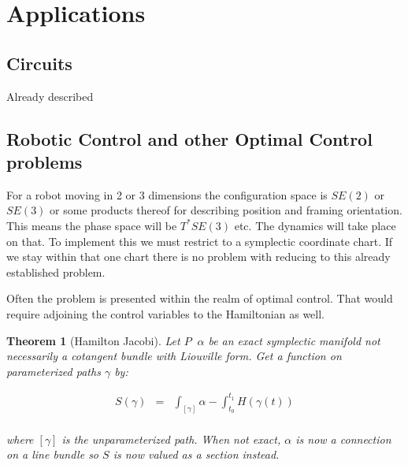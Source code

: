 \documentclass[a4paper,landscape]{article}
\theoremstyle{change}
\newtheorem{thm}[equation]{Theorem}
\theoremstyle{nonumberplain}
\numberwithin{equation}{section}
\begin{document}
\section{Applications}

\subsection{Circuits}

Already described

\subsection{Robotic Control and other Optimal Control problems}

For a robot moving in 2 or 3 dimensions the configuration space is $SE(2)$ or $SE(3)$ or some products thereof for describing position and framing orientation. This means the phase space will be $T^* SE(3)$ etc. The dynamics will take place on that. To implement this we must restrict to a symplectic coordinate chart. If we stay within that one chart there is no problem with reducing to this already established problem.

Often the problem is presented within the realm of optimal control. That would require adjoining the control variables to the Hamiltonian as well.

\begin{thm}[Hamilton Jacobi]

Let $P \; \; \alpha$ be an exact symplectic manifold not necessarily a cotangent bundle with Liouville form. Get a function on parameterized paths $\gamma$ by:

\begin{eqnarray*}
S (\gamma ) &=& \int_{[\gamma]} \alpha - \int_{t_0}^{t_1} H( \gamma (t) )\\
\end{eqnarray*}

where $[\gamma]$ is the unparameterized path. When not exact, $\alpha$ is now a connection on a line bundle so $S$ is now valued as a section instead.


\end{thm}
\end{document}
